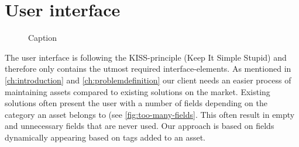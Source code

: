 \section{User interface}\label{sc:userinterface}

\begin{figure}[H]
    \centering
    \caption{Caption}
    \label{fig:too-many-fields}
\end{figure}

The user interface is following the KISS-principle (Keep It Simple Stupid) and therefore only contains the utmost required interface-elements. As mentioned in \autoref{ch:introduction} and \autoref{ch:problemdefinition} our client needs an easier process of maintaining assets compared to existing solutions on the market. Existing solutions often present the user with a number of fields depending on the category an asset belongs to (see \autoref{fig:too-many-fields}. This often result in empty and unnecessary fields that are never used. Our approach is based on fields dynamically appearing based on tags added to an asset.

